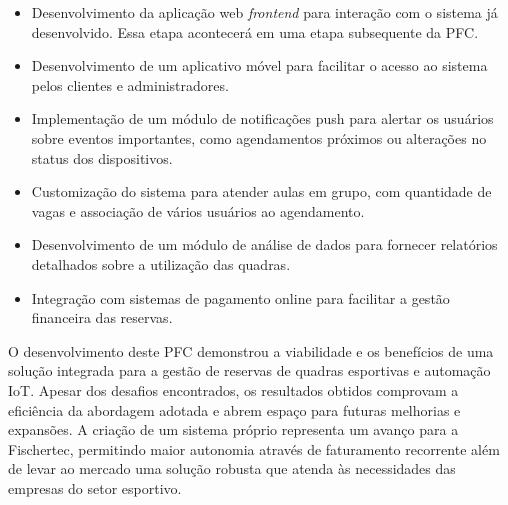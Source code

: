 \begin{itemize}
  \item Desenvolvimento da aplicação web \textit{frontend} para interação com o sistema já desenvolvido. Essa etapa acontecerá em uma etapa subsequente da \acrshort{PFC}.
  \item Desenvolvimento de um aplicativo móvel para facilitar o acesso ao sistema pelos clientes e administradores.
  \item Implementação de um módulo de notificações push para alertar os usuários sobre eventos importantes, como agendamentos próximos ou alterações no status dos dispositivos.
  \item Customização do sistema para atender aulas em grupo, com quantidade de vagas e associação de vários usuários ao agendamento.
  \item Desenvolvimento de um módulo de análise de dados para fornecer relatórios detalhados sobre a utilização das quadras.
  \item Integração com sistemas de pagamento online para facilitar a gestão financeira das reservas.
\end{itemize}

O desenvolvimento deste PFC demonstrou a viabilidade e os benefícios de uma solução integrada para a gestão de reservas de quadras esportivas e automação \acrshort{IoT}. Apesar dos desafios encontrados, os resultados obtidos comprovam a eficiência da abordagem adotada e abrem espaço para futuras melhorias e expansões. A criação de um sistema próprio representa um avanço para a Fischertec, permitindo maior autonomia através de faturamento recorrente além de levar ao mercado uma solução robusta que atenda às necessidades das empresas do setor esportivo.